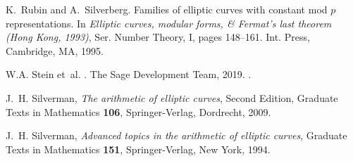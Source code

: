 \documentclass[12pt, reqno]{amsart}
\numberwithin{equation}{section}
\theoremstyle{definition}
\theoremstyle{remark}
\begin{document}
\begin{thebibliography}{999}
K.~Rubin and A.~Silverberg.
\newblock Families of elliptic curves with constant mod {$p$} representations.
\newblock In {\em Elliptic curves, modular forms, \& {F}ermat's last theorem
  ({H}ong {K}ong, 1993)}, Ser. Number Theory, I, pages 148--161. Int. Press,
  Cambridge, MA, 1995.

W.\thinspace{}A. Stein et~al.
.
\newblock The Sage Development Team, 2019.
.

 J.\ H. Silverman,
{\em The arithmetic of elliptic curves},
Second Edition, Graduate Texts in Mathematics {\bf 106}, Springer-Verlag, Dordrecht, 2009.

 J.\ H. Silverman,
{\em Advanced topics in the arithmetic of elliptic curves},
Graduate Texts in Mathematics {\bf 151}, Springer-Verlag, New York, 1994.



\end{thebibliography}
\end{document}
